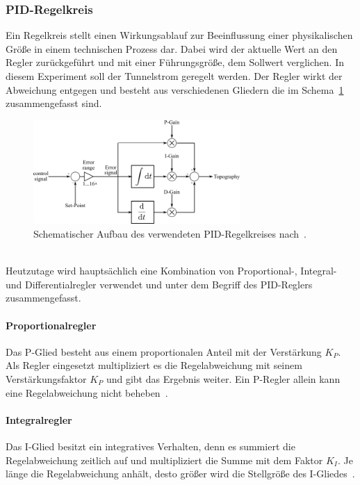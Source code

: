 \documentclass[a4paper,twoside,final]{article}
\begin{document}
\subsubsection{PID-Regelkreis}
Ein Regelkreis stellt einen Wirkungsablauf zur Beeinflussung einer physikalischen Größe in einem technischen Prozess dar. Dabei wird der aktuelle Wert an den Regler zurückgeführt und mit einer Führungsgröße, dem Sollwert verglichen. In diesem Experiment soll der Tunnelstrom geregelt werden. Der Regler wirkt der Abweichung entgegen und besteht aus verschiedenen Gliedern die im Schema~\ref{fig:PID} zusammengefasst sind.
\begin{figure}[htp]
    \centering
    \includegraphics[width=0.7\textwidth]{Bilder/PID-Regler.pdf}
    \caption{Schematischer Aufbau des verwendeten PID-Regelkreises nach~\cite{Nanosurf}.}
    \label{fig:PID}
\end{figure}\\
Heutzutage wird hauptsächlich eine Kombination von Proportional-, Integral- und Differentialregler verwendet und unter dem Begriff des PID-Reglers zusammengefasst.
\paragraph{Proportionalregler} Das P-Glied besteht aus einem proportionalen Anteil mit der Verstärkung $K_P$. Als Regler eingesetzt multipliziert es die Regelabweichung mit seinem Verstärkungsfaktor $K_P$ und gibt das Ergebnis weiter. Ein P-Regler allein kann eine Regelabweichung nicht beheben~\cite{Forker}.
\paragraph{Integralregler} Das I-Glied besitzt ein integratives Verhalten, denn es summiert die Regelabweichung zeitlich auf und multipliziert die Summe mit dem Faktor $K_I$. Je länge die Regelabweichung anhält, desto größer wird die Stellgröße des I-Gliedes~\cite{Forker}.
\end{document}

